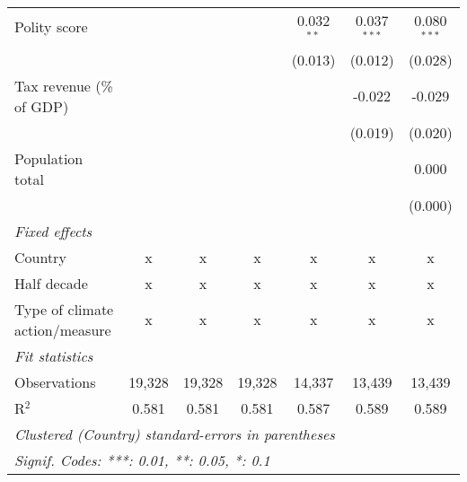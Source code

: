 \begin{tabular}{lcccccc}
   Polity score                                                          &         &                &                & 0.032$^{**}$   & 0.037$^{***}$  & 0.080$^{***}$\\   
                                                                         &         &                &                & (0.013)        & (0.012)        & (0.028)\\   
   Tax revenue (\% of GDP)                                               &         &                &                &                & -0.022         & -0.029\\   
                                                                         &         &                &                &                & (0.019)        & (0.020)\\   
   Population total                                                      &         &                &                &                &                & 0.000\\   
                                                                         &         &                &                &                &                & (0.000)\\   
   \emph{Fixed effects}\\
   Country                                                               & x       & x              & x              & x              & x              & x\\  
   Half decade                                                           & x       & x              & x              & x              & x              & x\\  
   Type of climate action/measure                                        & x       & x              & x              & x              & x              & x\\  
   \midrule \emph{Fit statistics}\\
   Observations                                                          & 19,328  & 19,328         & 19,328         & 14,337         & 13,439         & 13,439\\  
   R$^2$                                                                 & 0.581   & 0.581          & 0.581          & 0.587          & 0.589          & 0.589\\  
   \midrule
   \multicolumn{7}{l}{\emph{Clustered (Country) standard-errors in parentheses}}\\
   \multicolumn{7}{l}{\emph{Signif. Codes: ***: 0.01, **: 0.05, *: 0.1}}\\
\end{tabular}
\par\endgroup


